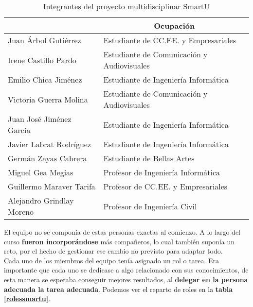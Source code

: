 \begin{table}
    \begin{center}
        \begin{tabular}{|p{4.5cm}|p{6.5cm}|}
            \hline
                \rowcolor{Gray}\multicolumn{1}{|c|}{\textbf{Integrante}}
                & \multicolumn{1}{|c|}{\textbf{Ocupación}} \\
            \hline
                Juan Árbol Gutiérrez & Estudiante de CC.EE. y Empresariales \\
            \hline
                Irene Castillo Pardo & Estudiante de Comunicación y Audiovisuales \\
            \hline
                Emilio Chica Jiménez & Estudiante de Ingeniería Informática \\
            \hline
                Victoria Guerra Molina & Estudiante de Comunicación y Audiovisuales \\
            \hline
                Juan José Jiménez García & Estudiante de Ingeniería Informática \\
            \hline
                Javier Labrat Rodríguez & Estudiante de Ingeniería Informática \\
            \hline
                Germán Zayas Cabrera & Estudiante de Bellas Artes \\
            \hline
                Miguel Gea Megías & Profesor de Ingeniería Informática \\
            \hline
                Guillermo Maraver Tarifa & Profesor de CC.EE. y Empresariales \\
            \hline
                Alejandro Grindlay Moreno & Profesor de Ingeniería Civil \\
            \hline
        \end{tabular}
        \caption{Integrantes del proyecto multidisciplinar SmartU}
        \label{miembrossmartu}
    \end{center}
\end{table}

El equipo no se componía de estas personas exactas al comienzo. A lo largo del curso \textbf{fueron incorporándose} más compañeros, lo cual también suponía un reto, por el hecho de gestionar ese cambio no previsto para adaptar todo.\\

Cada uno de los miembros del equipo tenía asignado un rol o tarea. Era importante que cada uno se dedicase a algo relacionado con sus conocimientos, de esta manera se esperaba conseguir mejores resultados, al \textbf{delegar en la persona adecuada la tarea adecuada}. Podemos ver el reparto de roles en la \textbf{tabla \ref{rolessmartu}}.\\

